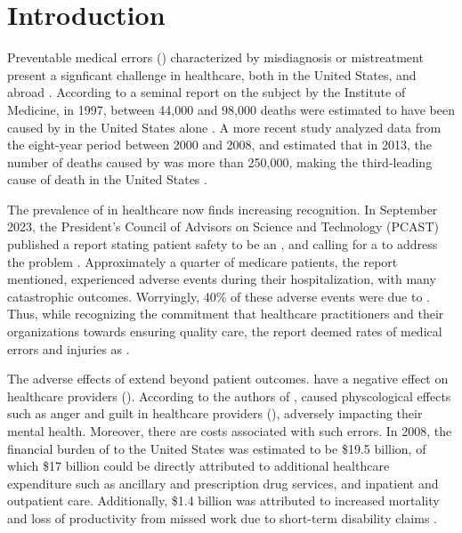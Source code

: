 \chapter{Introduction}\label{chapter:introduction}

Preventable medical errors (\PMEs{}) characterized by misdiagnosis or mistreatment present
a signficant challenge in healthcare, both in the United States, and abroad \cite{RodziewiczStatsPearls18}.
According to a seminal report on the subject by the Institute of Medicine, in 1997,
between 44,000 and 98,000 deaths were estimated to have been caused by \PMEs{} in
the United States alone \cite{DonaldsonBook00}.
A more recent study analyzed data from the eight-year
period between 2000 and 2008, and estimated that in 2013, the number of deaths
caused by \PMEs{} was more than 250,000, making \PMEs{} the third-leading
cause of death in the United States \cite{MakaryBMJ16}.

The prevalence of \PMEs{} in healthcare now finds increasing recognition.
In September 2023, the President's Council of Advisors on Science and
Technology (PCAST) published a report stating
patient safety to be an , and calling
for a  to address the problem \cite{PCAST23}.
Approximately a quarter of medicare
patients, the report mentioned, experienced adverse events during their hospitalization, with
many catastrophic outcomes. Worryingly, 40\% of these adverse events were
due to \PMEs{}. Thus, while recognizing the commitment that
healthcare practitioners and their organizations towards ensuring quality
care, the report deemed rates of medical errors and injuries as .

The adverse effects of \PMEs{} extend beyond patient outcomes.
\PMEs{} have a negative effect on healthcare providers (\HCPs). According to the authors of
\cite{RodziewiczStatsPearls18}, \PMEs{} caused physcological effects such
as anger and guilt in healthcare providers (\HCPs{}), adversely impacting their mental
health. Moreover, there are costs associated with such errors.
In 2008, the financial burden of \PMEs{} to the United States was
estimated to be \$19.5 billion, of which \$17 billion could be
directly attributed to additional healthcare expenditure such as
ancillary and prescription drug services, and inpatient and outpatient care.
Additionally, \$1.4 billion was attributed to increased mortality and loss
of productivity from missed work due to short-term disability claims \cite{AndelJHCF12}.

